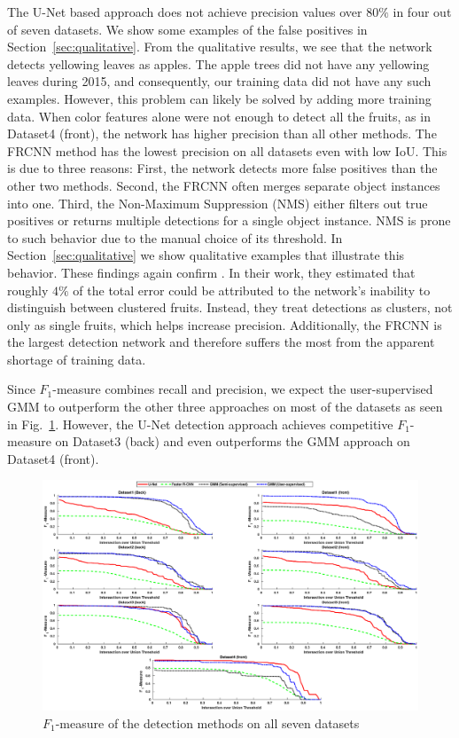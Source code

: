 The U-Net based approach does not achieve precision values over $80\%$ in four out of seven datasets. We show some examples of the false positives in Section~\ref{sec:qualitative}. From the qualitative results, we see that the network detects yellowing leaves as apples. The apple trees did not have any yellowing leaves during 2015, and consequently, our training data did not have any such examples. However, this problem can likely be solved by adding more training data. When color features alone were not enough to detect all the fruits, as in Dataset4 (front), the network has higher precision than all other methods. 
The FRCNN method has the lowest precision on all datasets even with low IoU. This is due to three reasons: First, the network detects more false positives than the other two methods. Second, the FRCNN often merges separate object instances into one. Third, the Non-Maximum Suppression (NMS) either filters out true positives or returns multiple detections for a single object instance. NMS is prone to such behavior due to the manual choice of its threshold. In Section~\ref{sec:qualitative} we show qualitative examples that illustrate this behavior.  
These findings again confirm \cite{bargoti_deep_2017}. In their work, they estimated that roughly $4\%$ of the total error could be attributed to the network's inability to distinguish between clustered fruits. Instead, they treat detections as clusters, not only as single fruits, which helps increase precision. Additionally, the FRCNN is the largest detection network and therefore suffers the most from the apparent shortage of training data.

Since $F_1$-measure combines recall and precision, we expect the user-supervised GMM to outperform the other three approaches on most of the datasets as seen in Fig.~\ref{fig:F1}. However, the U-Net detection approach achieves competitive $F_1$-measure on Dataset3 (back) and even outperforms the GMM approach on Dataset4 (front).

\begin{figure}[!htbp]
    \centering
    \includegraphics[width=\textwidth]{figures/detection/f1_with_semisup_gmm_.eps}
    \caption[$F_1$-measure for the detection methods.]{$F_1$-measure of the detection methods on all seven datasets}
    \label{fig:F1}
\end{figure}


